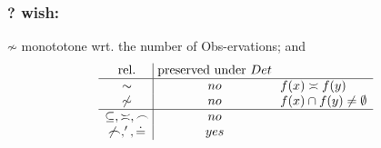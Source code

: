 \documentclass[10pt]{article}
\begin{document}
\subsubsection*{? wish:}
$\not\sim$ monototone wrt. the number of Obs-ervations; and
\[\begin{array}{c@{\ }|@{\ }c@{\ \ }l}
{\rm rel.} & {\rm  preserved\ under\ }Det & \\ \hline
\sim &  no & f(x)\seteq f(y) \\
\not\sim & no & f(x)\cap f(y)\not=\es \\ \hline
\subseteq, \seteq, \frown & no \\
\not\frown, ',\deteq & yes & 
\end{array}
\]






\end{document}
